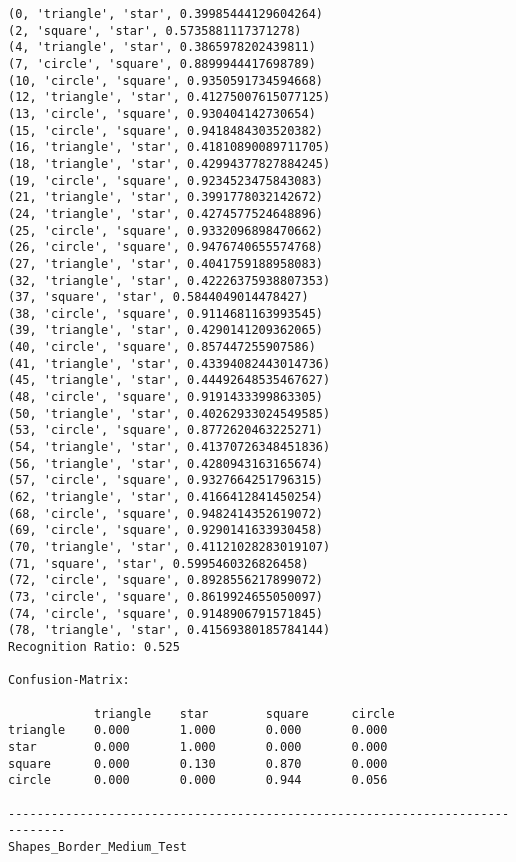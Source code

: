 \documentclass[a4paper, 10pt]{article}
\begin{document}
\begin{verbatim}
(0, 'triangle', 'star', 0.39985444129604264)
(2, 'square', 'star', 0.5735881117371278)
(4, 'triangle', 'star', 0.3865978202439811)
(7, 'circle', 'square', 0.8899944417698789)
(10, 'circle', 'square', 0.9350591734594668)
(12, 'triangle', 'star', 0.41275007615077125)
(13, 'circle', 'square', 0.930404142730654)
(15, 'circle', 'square', 0.9418484303520382)
(16, 'triangle', 'star', 0.41810890089711705)
(18, 'triangle', 'star', 0.42994377827884245)
(19, 'circle', 'square', 0.9234523475843083)
(21, 'triangle', 'star', 0.3991778032142672)
(24, 'triangle', 'star', 0.4274577524648896)
(25, 'circle', 'square', 0.9332096898470662)
(26, 'circle', 'square', 0.9476740655574768)
(27, 'triangle', 'star', 0.4041759188958083)
(32, 'triangle', 'star', 0.42226375938807353)
(37, 'square', 'star', 0.5844049014478427)
(38, 'circle', 'square', 0.9114681163993545)
(39, 'triangle', 'star', 0.4290141209362065)
(40, 'circle', 'square', 0.857447255907586)
(41, 'triangle', 'star', 0.43394082443014736)
(45, 'triangle', 'star', 0.44492648535467627)
(48, 'circle', 'square', 0.9191433399863305)
(50, 'triangle', 'star', 0.40262933024549585)
(53, 'circle', 'square', 0.8772620463225271)
(54, 'triangle', 'star', 0.41370726348451836)
(56, 'triangle', 'star', 0.4280943163165674)
(57, 'circle', 'square', 0.9327664251796315)
(62, 'triangle', 'star', 0.4166412841450254)
(68, 'circle', 'square', 0.9482414352619072)
(69, 'circle', 'square', 0.9290141633930458)
(70, 'triangle', 'star', 0.41121028283019107)
(71, 'square', 'star', 0.5995460326826458)
(72, 'circle', 'square', 0.8928556217899072)
(73, 'circle', 'square', 0.8619924655050097)
(74, 'circle', 'square', 0.9148906791571845)
(78, 'triangle', 'star', 0.41569380185784144)
Recognition Ratio: 0.525

Confusion-Matrix:

            triangle    star        square      circle      
triangle    0.000       1.000       0.000       0.000       
star        0.000       1.000       0.000       0.000       
square      0.000       0.130       0.870       0.000       
circle      0.000       0.000       0.944       0.056       

------------------------------------------------------------------------------
Shapes_Border_Medium_Test


\end{verbatim}
\end{document}
